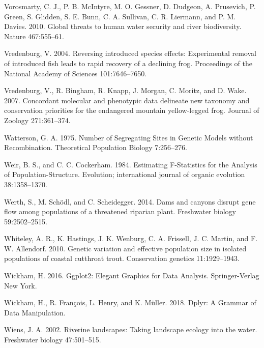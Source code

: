 \documentclass[proquest,12pt,final]{ucthesis-CA2012} %
\begin{document}
\begin{ucmainmatter}
\leavevmode\hypertarget{ref-vorosmarty_global_2010}{}%
Vorosmarty, C. J., P. B. McIntyre, M. O. Gessner, D. Dudgeon, A.
Prusevich, P. Green, S. Glidden, S. E. Bunn, C. A. Sullivan, C. R.
Liermann, and P. M. Davies. 2010. Global threats to human water security
and river biodiversity. Nature 467:555--61.

\leavevmode\hypertarget{ref-vredenburg_reversing_2004}{}%
Vredenburg, V. 2004. Reversing introduced species effects: Experimental
removal of introduced fish leads to rapid recovery of a declining frog.
Proceedings of the National Academy of Sciences 101:7646--7650.

\leavevmode\hypertarget{ref-vredenburg_concordant_2007}{}%
Vredenburg, V., R. Bingham, R. Knapp, J. Morgan, C. Moritz, and D. Wake.
2007. Concordant molecular and phenotypic data delineate new taxonomy
and conservation priorities for the endangered mountain yellow-legged
frog. Journal of Zoology 271:361--374.

\leavevmode\hypertarget{ref-watterson_number_1975}{}%
Watterson, G. A. 1975. Number of Segregating Sites in Genetic Models
without Recombination. Theoretical Population Biology 7:256--276.

\leavevmode\hypertarget{ref-weir_estimating_1984}{}%
Weir, B. S., and C. C. Cockerham. 1984. Estimating F-Statistics for the
Analysis of Population-Structure. Evolution; international journal of
organic evolution 38:1358--1370.

\leavevmode\hypertarget{ref-werth_dams_2014}{}%
Werth, S., M. Schödl, and C. Scheidegger. 2014. Dams and canyons disrupt
gene flow among populations of a threatened riparian plant. Freshwater
biology 59:2502--2515.

\leavevmode\hypertarget{ref-whiteley_genetic_2010}{}%
Whiteley, A. R., K. Hastings, J. K. Wenburg, C. A. Frissell, J. C.
Martin, and F. W. Allendorf. 2010. Genetic variation and effective
population size in isolated populations of coastal cutthroat trout.
Conservation genetics 11:1929--1943.

\leavevmode\hypertarget{ref-wickham_ggplot2_2016}{}%
Wickham, H. 2016. Ggplot2: Elegant Graphics for Data Analysis.
Springer-Verlag New York.

\leavevmode\hypertarget{ref-wickham_dplyr_2018}{}%
Wickham, H., R. François, L. Henry, and K. Müller. 2018. Dplyr: A
Grammar of Data Manipulation.

\leavevmode\hypertarget{ref-wiens_riverine_2002}{}%
Wiens, J. A. 2002. Riverine landscapes: Taking landscape ecology into
the water. Freshwater biology 47:501--515.


\end{ucmainmatter}
\end{document}
